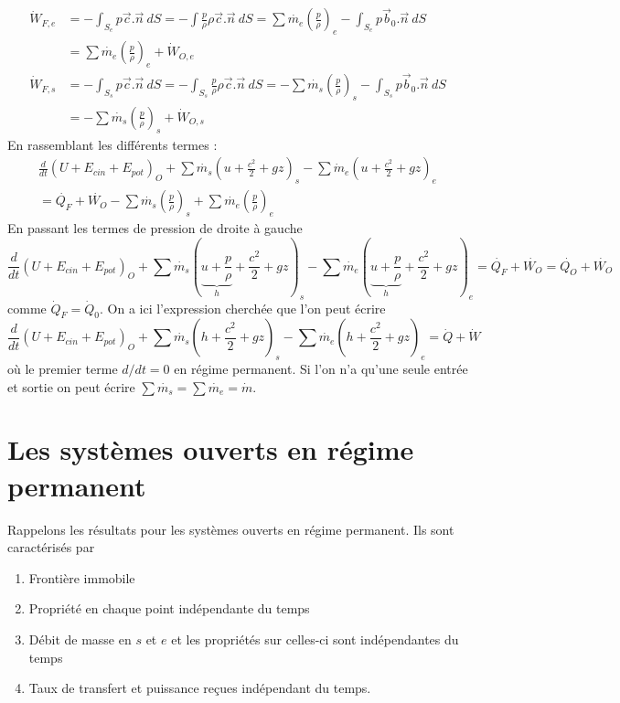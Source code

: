 \begin{equation}
\begin{split}
\dot{W}_{F,e} &= -\int_{S_e}p\vec{c}.\vec{n}\ dS = -\int \frac{p}{\rho}\rho
\vec{c}.\vec{n}\ dS = \sum\dot{m_e}\left(\frac{p}{\rho}\right)_e-\int_{S_e}
p\vec{b}_0.\vec{n}\ dS\\
 &=  \sum\dot{m_e}\left(\frac{p}{\rho}\right)_e + \dot{W}_{O,e}\\
\dot{W}_{F,s} &= -\int_{S_s}p\vec{c}.\vec{n}\ dS = -\int_{S_s} \frac{p}{\rho}\rho
\vec{c}.\vec{n}\ dS = -\sum\dot{m_s}\left(\frac{p}{\rho}\right)_s-\int_{S_s}
p\vec{b}_0.\vec{n}\ dS\\
 &= - \sum\dot{m_s}\left(\frac{p}{\rho}\right)_s + \dot{W}_{O,s}
\end{split}
\end{equation}
En rassemblant les différents termes :
\begin{equation}
\begin{split}
\frac{d}{dt}\left(U+E_{cin}+E_{pot}\right)_O + \sum \dot{m_s}\left(u+\frac{c^2}{2}+gz\right)_s-\sum \dot{m}_e\left(u+\frac{c^2}{2}+gz\right)_e \\
= \dot{Q_F}+\dot{W_O}
-\sum\dot{m_s}\left(\frac{p}{\rho}\right)_s+\sum\dot{m_e}\left(\frac{p}{\rho}\right)_e
\end{split}
\end{equation}
En passant les termes de pression de droite à gauche
\begin{equation}
\frac{d}{dt}\left(U+E_{cin}+E_{pot}\right)_O + \sum \dot{m_s}\left(\underbrace{u + 
\frac{p}{\rho}}_{h} + \frac{c^2}{2}+gz\right)_s-\sum \dot{m_e}\left(\underbrace{u + 
\frac{p}{\rho}}_{h} + \frac{c^2}{2}+gz\right)_e = \dot{Q_F}+\dot{W_O} = \dot{Q_O}+
\dot{W_O}
\end{equation}
comme $\dot{Q}_F = \dot{Q}_0$. On a ici l'expression cherchée que l'on peut écrire 
\begin{equation}
\frac{d}{dt}\left(U+E_{cin}+E_{pot}\right)_O + \sum \dot{m_s}\left(h+\frac{c^2}{2}
+gz\right)_s-\sum \dot{m_e}\left(h+\frac{c^2}{2}+gz\right)_e = \dot{Q}+\dot{W}
\end{equation}
où le premier terme $d/dt=0$ en régime permanent. Si l'on n'a qu'une seule entrée 
et sortie on peut écrire $\sum \dot{m_s}=\sum \dot{m_e}=\dot{m}$.


\section{Les systèmes ouverts en régime permanent}
Rappelons les résultats pour les systèmes ouverts en régime permanent. Ils sont 
caractérisés par 
\begin{enumerate}
\item Frontière immobile
\item Propriété en chaque point indépendante du temps
\item Débit de masse en $s$ et $e$ et les propriétés sur celles-ci sont 
indépendantes du temps
\item Taux de transfert et puissance reçues indépendant du temps.
\end{enumerate}


